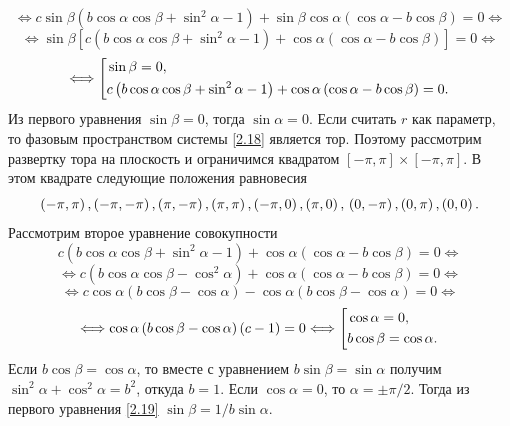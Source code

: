 \documentclass[a4paper,12pt, openany]{book}
\theoremstyle{plain} %
\theoremstyle{definition} %
\theoremstyle{remark} %
\numberwithin{equation}{chapter}
\begin{document}
{\[\]
\[
 \Longleftrightarrow c\sin \beta \left( {b\cos \alpha \cos \beta  + \sin ^2 \alpha  - 1} \right) + \sin \beta \cos \alpha \left( {\cos \alpha  - b\cos \beta } \right) = 0 \Longleftrightarrow 
\]
\[
 \Longleftrightarrow \sin \beta \left[ {c\left( {b\cos \alpha \cos \beta  + \sin ^2 \alpha  - 1} \right) + \cos \alpha \left( {\cos \alpha  - b\cos \beta } \right)} \right] = 0 \Longleftrightarrow 
\]
\[
 \Longleftrightarrow \left[ {\begin{aligned}
   &\sin \beta  = 0, \hfill  \\
   &c\left( {b\cos \alpha \cos \beta  + \sin ^2 \alpha  - 1} \right) + \cos \alpha \left( {\cos \alpha  - b\cos \beta } \right) = 0. \hfill  \\
\end{aligned}} \right.
\]
Из первого уравнения $\sin\beta = 0$, тогда $\sin\alpha = 0$. Если считать $r$ как параметр, то фазовым пространством системы \eqref{2.18} является тор. Поэтому рассмотрим развертку тора на плоскость и ограничимся квадратом $[-\pi,\pi]\times[-\pi,\pi]$. В этом квадрате следующие положения равновесия 
\begin{equation}\label{2.20}
\left( { - \pi ,\pi } \right),\left( { - \pi , - \pi } \right),\left( {\pi , - \pi } \right),\left( {\pi ,\pi } \right),\left( { - \pi ,0} \right),\left( {\pi ,0} \right),\\\left( {0, - \pi } \right),\left( {0,\pi } \right),\left( {0,0} \right).
\end{equation}
Рассмотрим второе уравнение совокупности 
\[
c\left( {b\cos \alpha \cos \beta  + \sin ^2 \alpha  - 1} \right) + \cos \alpha \left( {\cos \alpha  - b\cos \beta } \right) = 0 \Longleftrightarrow 
\]
\[
 \Longleftrightarrow c\left( {b\cos \alpha \cos \beta  - \cos ^2 \alpha } \right) + \cos \alpha \left( {\cos \alpha  - b\cos \beta } \right) = 0 \Longleftrightarrow 
\]
\[
 \Longleftrightarrow c\cos \alpha \left( {b\cos \beta  - \cos \alpha } \right) - \cos \alpha \left( {b\cos \beta  - \cos \alpha } \right) = 0 \Longleftrightarrow 
\]
\[
 \Longleftrightarrow \cos \alpha \left( {b\cos \beta  - \cos \alpha } \right)\left( {c - 1} \right) = 0 \Longleftrightarrow \left[ {\begin{aligned}
   &\cos \alpha  = 0, \hfill  \\
   &b\cos \beta  = \cos \alpha . \hfill  \\
\end{aligned}} \right.
\]
Если $b\cos\beta = \cos\alpha$, то вместе с уравнением $b\sin\beta = \sin\alpha$ получим $\sin^2\alpha + \cos^2\alpha = b^2$, откуда $b = 1$. Если $\cos\alpha = 0$, то $\alpha = \pm\pi/2$. Тогда из первого уравнения \eqref{2.19}  $\sin\beta = 1/b \sin\alpha$. 

}
\end{document}

